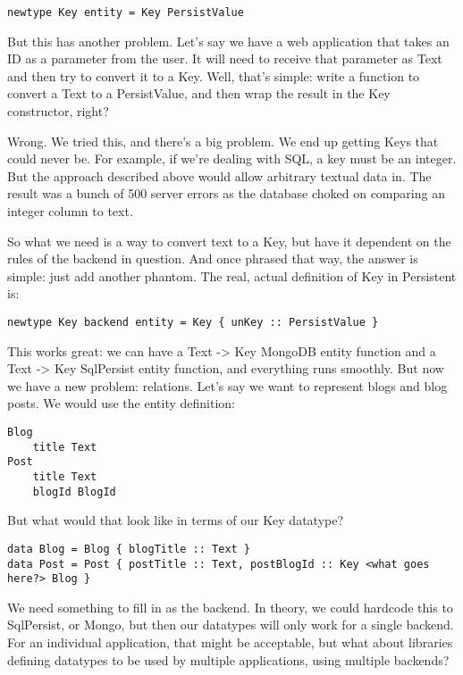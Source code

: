 \begin{lstlisting}
newtype Key entity = Key PersistValue
\end{lstlisting}

But this has another problem. Let's say we have a web application that takes an ID as a parameter from the user. It will need to receive that parameter as Text and then try to convert it to a Key. Well, that's simple: write a function to convert a Text to a PersistValue, and then wrap the result in the Key constructor, right?

Wrong. We tried this, and there's a big problem. We end up getting Keys that could never be. For example, if we're dealing with SQL, a key must be an integer. But the approach described above would allow arbitrary textual data in. The result was a bunch of 500 server errors as the database choked on comparing an integer column to text.

So what we need is a way to convert text to a Key, but have it dependent on the rules of the backend in question. And once phrased that way, the answer is simple: just add another phantom. The real, actual definition of Key in Persistent is:

\begin{lstlisting}
newtype Key backend entity = Key { unKey :: PersistValue }
\end{lstlisting}

This works great: we can have a Text -> Key MongoDB entity function and a Text -> Key SqlPersist entity function, and everything runs smoothly. But now we have a new problem: relations. Let's say we want to represent blogs and blog posts. We would use the entity definition:

\begin{lstlisting}
Blog
    title Text
Post
    title Text
    blogId BlogId
\end{lstlisting}

But what would that look like in terms of our Key datatype?

\begin{lstlisting}
data Blog = Blog { blogTitle :: Text }
data Post = Post { postTitle :: Text, postBlogId :: Key <what goes here?> Blog }
\end{lstlisting}

We need something to fill in as the backend. In theory, we could hardcode this to SqlPersist, or Mongo, but then our datatypes will only work for a single backend. For an individual application, that might be acceptable, but what about libraries defining datatypes to be used by multiple applications, using multiple backends?

